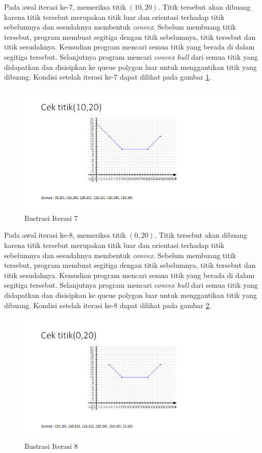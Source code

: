 \par Pada awal iterasi ke-7, memeriksa titik $(10,20)$. Titik tersebut akan dibuang karena titik tersebut merupakan titik luar dan orientasi terhadap titik sebelumnya dan sesudahnya membentuk \textit{convex}. Sebelum membuang titik tersebut, program membuat segitiga dengan titik sebelumnya, titik tersebut dan titik sesudahnya. Kemudian program mencari semua titik yang berada di dalam segitiga tersebut. Selanjutnya program mencari \textit{convex hull} dari semua titik yang didapatkan dan disisipkan ke queue polygon luar untuk menggantikan titik yang dibuang. Kondisi setelah iterasi ke-7 dapat dilihat pada gambar \ref{fig:iterasi-7}.
\begin{figure}[!h]
	\Centering
	\includegraphics [width=\columnwidth]{bab5/img/iterasi-7}
	\caption {Ilustrasi Iterasi 7}
	\label {fig:iterasi-7}
\end{figure}

\par Pada awal iterasi ke-8, memeriksa titik $(0,20)$. Titik tersebut akan dibuang karena titik tersebut merupakan titik luar dan orientasi terhadap titik sebelumnya dan sesudahnya membentuk \textit{convex}. Sebelum membuang titik tersebut, program membuat segitiga dengan titik sebelumnya, titik tersebut dan titik sesudahnya. Kemudian program mencari semua titik yang berada di dalam segitiga tersebut. Selanjutnya program mencari \textit{convex hull} dari semua titik yang didapatkan dan disisipkan ke queue polygon luar untuk menggantikan titik yang dibuang. Kondisi setelah iterasi ke-8 dapat dilihat pada gambar \ref{fig:iterasi-8}.
\begin{figure}[!h]
	\Centering
	\includegraphics [width=\columnwidth]{bab5/img/iterasi-8}
	\caption {Ilustrasi Iterasi 8}
	\label {fig:iterasi-8}
\end{figure}

